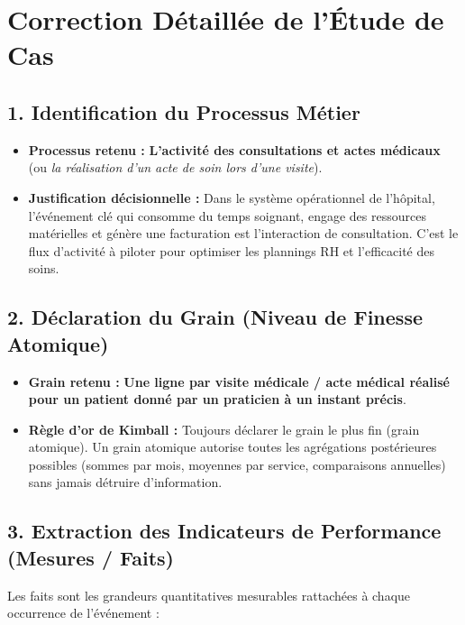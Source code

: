 \documentclass[11pt, a4paper]{article}
\begin{document}
\section{Correction Détaillée de l'Étude de Cas}

\subsection{1. Identification du Processus Métier}
\begin{itemize}[label=$\blacktriangleright$]
    \item \textbf{Processus retenu :} \textbf{L'activité des consultations et actes médicaux} (ou \textit{la réalisation d'un acte de soin lors d'une visite}).
    \item \textbf{Justification décisionnelle :} Dans le système opérationnel de l'hôpital, l'événement clé qui consomme du temps soignant, engage des ressources matérielles et génère une facturation est l'interaction de consultation. C'est le flux d'activité à piloter pour optimiser les plannings RH et l'efficacité des soins.
\end{itemize}

\subsection{2. Déclaration du Grain (Niveau de Finesse Atomique)}
\begin{itemize}[label=$\blacktriangleright$]
    \item \textbf{Grain retenu :} \textbf{Une ligne par visite médicale / acte médical réalisé pour un patient donné par un praticien à un instant précis}.
    \item \textbf{Règle d'or de Kimball :} Toujours déclarer le grain le plus fin (grain atomique). Un grain atomique autorise toutes les agrégations postérieures possibles (sommes par mois, moyennes par service, comparaisons annuelles) sans jamais détruire d'information.
\end{itemize}

\subsection{3. Extraction des Indicateurs de Performance (Mesures / Faits)}
Les faits sont les grandeurs quantitatives mesurables rattachées à chaque occurrence de l'événement :
\end{document}
